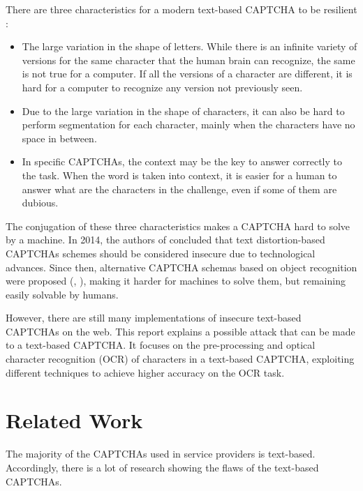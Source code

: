 \documentclass[journal]{IEEEtran}
\begin{document}
There are three characteristics for a modern text-based CAPTCHA to be resilient \cite{wiki:captcha}:
\begin{itemize}
    \item The large variation in the shape of letters. While there is an infinite variety of versions for the same character that the human brain can recognize, the same is not true for a computer. If all the versions of a character are different, it is hard for a computer to recognize any version not previously seen.
    \item Due to the large variation in the shape of characters, it can also be hard to perform segmentation for each character, mainly when the characters have no space in between.
    \item In specific CAPTCHAs, the context may be the key to answer correctly to the task. When the word is taken into context, it is easier for a human to answer what are the characters in the challenge, even if some of them are dubious.
\end{itemize}

The conjugation of these three characteristics makes a CAPTCHA hard to solve by a machine. In 2014, the authors of \cite{185128} concluded that text distortion-based CAPTCHAs schemes should be considered insecure due to technological advances. Since then, alternative CAPTCHA schemas based on object recognition were proposed (\cite{Sivakorn2016}, \cite{Zhao:2018:TES:3270101.3270104}), making it harder for machines to solve them, but remaining easily solvable by humans.

However, there are still many implementations of insecure text-based CAPTCHAs on the web. This report explains a possible attack that can be made to a text-based CAPTCHA. It focuses on the pre-processing and optical character recognition (OCR) of characters in a text-based CAPTCHA, exploiting different techniques to achieve higher accuracy on the OCR task.


\section{Related Work}

The majority of the CAPTCHAs used in service providers is text-based. Accordingly, there is a lot of research showing the flaws of the text-based CAPTCHAs.
\end{document}
